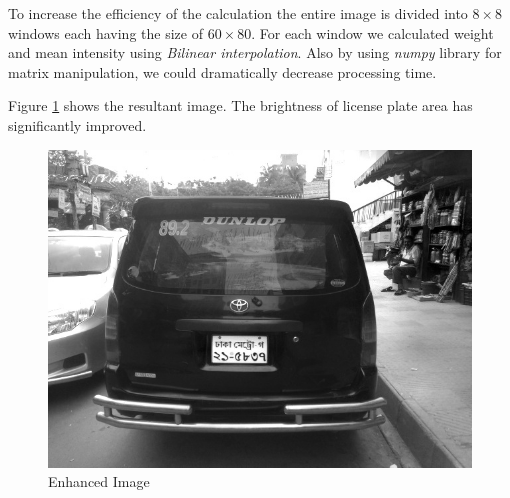 \documentclass{standalone}
\begin{document}
To increase the efficiency of the calculation the entire image is divided into $8 \times 8$ windows each having the size of $60 \times 80$. For each window we calculated weight and mean intensity using {\it Bilinear interpolation}. Also by using {\it numpy} library for matrix manipulation, we could dramatically decrease processing time.

Figure \ref{fig:EnhanceSample} shows the resultant image. The brightness of license plate area has significantly improved.
\begin{figure}
	\centering
	\includegraphics[width=.8\linewidth]{./img/sample/stage4.jpg}
	\caption{Enhanced Image} 
	\label{fig:EnhanceSample}
\end{figure}
\end{document}
